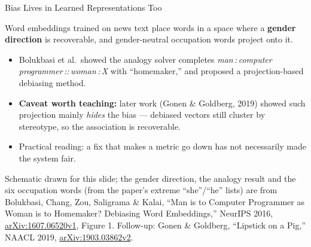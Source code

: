 
\begin{frame}{Bias Lives in Learned Representations Too}

    Word embeddings trained on news text place words in a space where a
    \textbf{gender direction} is recoverable, and gender-neutral occupation words project onto it.

    \vspace{0.12em}
    \centering

    \vspace{0.27em}

    \begin{itemize}\scriptsize
        \setlength\itemsep{0.1em}
        \item Bolukbasi et al.\ showed the analogy solver completes
              \emph{man\,:\,computer programmer\,::\,woman\,:\,X} with ``homemaker,''
              and proposed a projection-based debiasing method.
        \item \textbf{Caveat worth teaching:} later work (Gonen \& Goldberg, 2019) showed such
              projection mainly \emph{hides} the bias --- debiased vectors still cluster by
              stereotype, so the association is recoverable.
        \item Practical reading: a fix that makes a metric go down has not necessarily made the
              system fair.
    \end{itemize}

    \vspace{0.09em}
    {\scriptsize Schematic drawn for this slide; the gender direction, the analogy result and the
    six occupation words (from the paper's extreme ``she''/``he'' lists) are from Bolukbasi, Chang,
    Zou, Saligrama \& Kalai, ``Man is to Computer Programmer as Woman is to Homemaker? Debiasing
    Word Embeddings,'' NeurIPS 2016, \href{https://arxiv.org/abs/1607.06520v1}{arXiv:1607.06520v1},
    Figure 1. Follow-up: Gonen \& Goldberg, ``Lipstick on a Pig,'' NAACL 2019,
    \href{https://arxiv.org/abs/1903.03862v2}{arXiv:1903.03862v2}.}
\end{frame}
